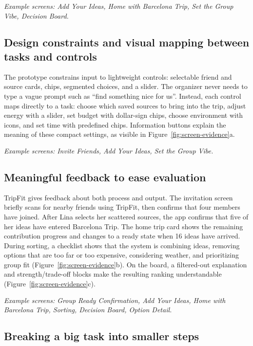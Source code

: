 \documentclass[11pt,a4paper]{article}
\begin{document}
\textit{Example screens: Add Your Ideas, Home with Barcelona Trip, Set the Group Vibe, Decision Board.}

\subsection{Design constraints and visual mapping between tasks and controls}

The prototype constrains input to lightweight controls: selectable friend and source cards, chips, segmented choices, and a slider. The organizer never needs to type a vague prompt such as ``find something nice for us''. Instead, each control maps directly to a task: choose which saved sources to bring into the trip, adjust energy with a slider, set budget with dollar-sign chips, choose environment with icons, and set time with predefined chips. Information buttons explain the meaning of these compact settings, as visible in Figure~\ref{fig:screen-evidence}a.

\textit{Example screens: Invite Friends, Add Your Ideas, Set the Group Vibe.}

\subsection{Meaningful feedback to ease evaluation}

TripFit gives feedback about both process and output. The invitation screen briefly scans for nearby friends using TripFit, then confirms that four members have joined. After Lina selects her scattered sources, the app confirms that five of her ideas have entered Barcelona Trip. The home trip card shows the remaining contribution progress and changes to a ready state when 16 ideas have arrived. During sorting, a checklist shows that the system is combining ideas, removing options that are too far or too expensive, considering weather, and prioritizing group fit (Figure~\ref{fig:screen-evidence}b). On the board, a filtered-out explanation and strength/trade-off blocks make the resulting ranking understandable (Figure~\ref{fig:screen-evidence}c).

\textit{Example screens: Group Ready Confirmation, Add Your Ideas, Home with Barcelona Trip, Sorting, Decision Board, Option Detail.}

\subsection{Breaking a big task into smaller steps}
\end{document}
